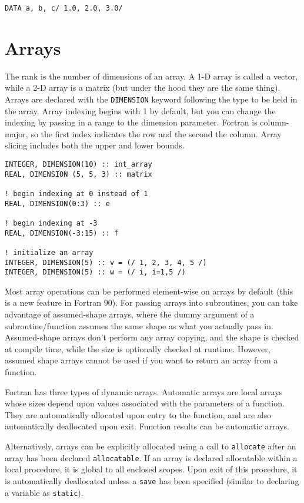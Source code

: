 \documentclass[10pt]{article}
\begin{document}
\begin{lstlisting}
DATA a, b, c/ 1.0, 2.0, 3.0/
\end{lstlisting}

\section{Arrays}
The rank is the number of dimensions of an array. A 1-D array is called a vector, while a 2-D array is a matrix (but under the hood they are the same thing). Arrays are declared with the {\tt DIMENSION} keyword following the type to be held in the array. Array indexing begins with 1 by default, but you can change the indexing by passing in a range to the dimension parameter. Fortran is column-major, so the first index indicates the row and the second the column. Array slicing includes both the upper and lower bounds.

\begin{lstlisting}
INTEGER, DIMENSION(10) :: int_array
REAL, DIMENSION (5, 5, 3) :: matrix

! begin indexing at 0 instead of 1
REAL, DIMENSION(0:3) :: e

! begin indexing at -3
REAL, DIMENSION(-3:15) :: f

! initialize an array
INTEGER, DIMENSION(5) :: v = (/ 1, 2, 3, 4, 5 /)
INTEGER, DIMENSION(5) :: w = (/ i, i=1,5 /)
\end{lstlisting}

Most array operations can be performed element-wise on arrays by default (this is a new feature in Fortran 90). For passing arrays into subroutines, you can take advantage of assumed-shape arrays, where the dummy argument of a subroutine/function assumes the same shape as what you actually pass in. Assumed-shape arrays don't perform any array copying, and the shape is checked at compile time, while the size is optionally checked at runtime. However, assumed shape arrays cannot be used if you want to return an array from a function.

Fortran has three types of dynamic arrays. Automatic arrays are local arrays whose sizes depend upon values associated with the parameters of a function. They are automatically allocated upon entry to the function, and are also automatically deallocated upon exit. Function results can be automatic arrays. 

Alternatively, arrays can be explicitly allocated using a call to {\tt allocate} after an array has been declared {\tt allocatable}. If an array is declared allocatable within a local procedure, it is global to all enclosed scopes. Upon exit of this procedure, it is automatically deallocated unless a {\tt save} has been specified (similar to declaring a variable as {\tt static}).
\end{document}

